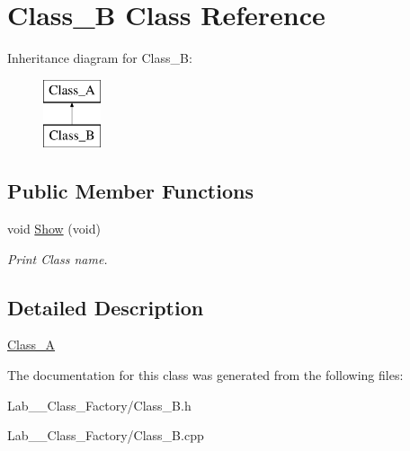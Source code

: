 \hypertarget{class_class___b}{\section{Class\+\_\+\+B Class Reference}
\label{class_class___b}
}
Inheritance diagram for Class\+\_\+\+B\+:\begin{figure}[H]
\begin{center}
\leavevmode
\includegraphics[height=2.000000cm]{class_class___b}
\end{center}
\end{figure}
\subsection*{Public Member Functions}
\begin{DoxyCompactItemize}
\item 
\hypertarget{class_class___b_a1d90a8dc22382d3b6fafe2cab30dd842}{void \hyperlink{class_class___b_a1d90a8dc22382d3b6fafe2cab30dd842}{Show} (void)}\label{class_class___b_a1d90a8dc22382d3b6fafe2cab30dd842}

\begin{DoxyCompactList}\small\item\em Print Class name. \end{DoxyCompactList}\end{DoxyCompactItemize}


\subsection{Detailed Description}
\hyperlink{class_class___a}{Class\+\_\+\+A} 

The documentation for this class was generated from the following files\+:\begin{DoxyCompactItemize}
\item 
Lab\+\_\+\_\+\+Class\+\_\+\+Factory/Class\+\_\+\+B.\+h\item 
Lab\+\_\+\_\+\+Class\+\_\+\+Factory/Class\+\_\+\+B.\+cpp\end{DoxyCompactItemize}
